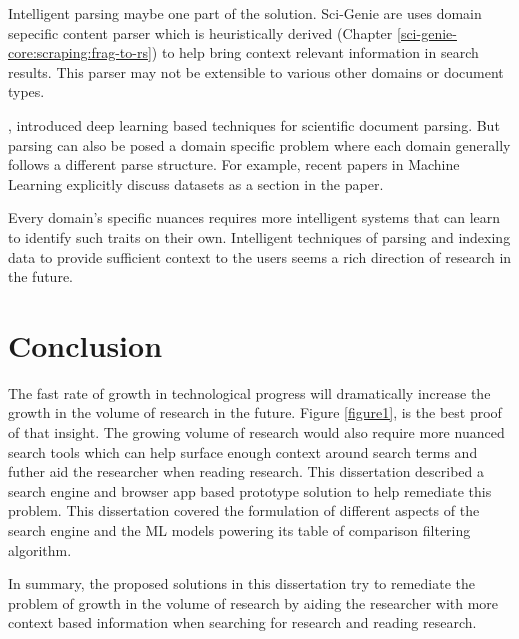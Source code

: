 Intelligent parsing maybe one part of the solution. Sci-Genie are uses domain sepecific content parser which is heuristically derived (Chapter \ref{sci-genie-core:scraping:frag-to-rs}) to help bring context relevant information in search results. This parser may not be extensible to various other domains or document types.

\cite{kashyap2020sciwing}, introduced deep learning based techniques for scientific document parsing. But parsing can also be posed a domain specific problem where each domain generally follows a different parse structure. For example, recent papers in Machine Learning explicitly discuss datasets as a section in the paper.

Every domain's specific nuances requires more intelligent systems that can learn to identify such traits on their own. Intelligent techniques of parsing and indexing data to provide sufficient context to the users seems a rich direction of research in the future.

\section{Conclusion}
The fast rate of growth in technological progress will dramatically increase the growth in the volume of research in the future. Figure \ref{figure1}, is the best proof of that insight. The growing volume of research would also require more nuanced search tools which can help surface enough context around search terms and futher aid the researcher when reading research. This dissertation described a search engine and browser app based prototype solution to help remediate this problem. This dissertation covered the formulation of different aspects of the search engine and the ML models powering its table of comparison filtering algorithm. 

In summary, the proposed solutions in this dissertation try to remediate the problem of growth in the volume of research by aiding the researcher with more context based information when searching for research and reading research.